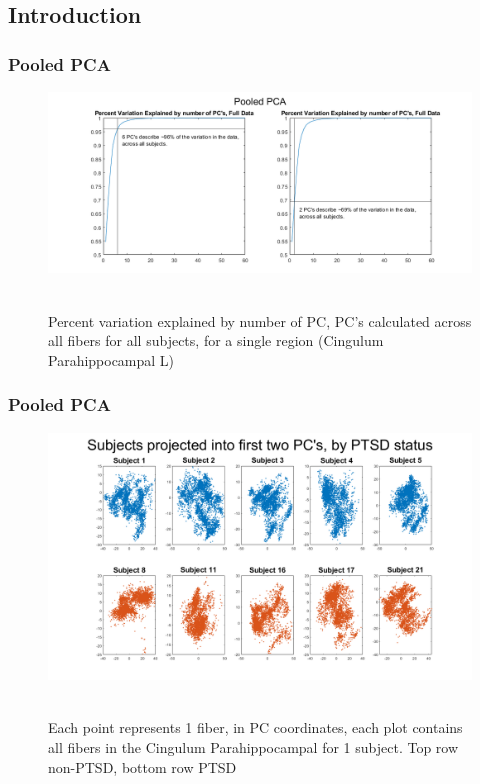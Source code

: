 \documentclass{beamer}
\begin{document}
\subsection{Introduction}
\begin{frame}
\frametitle{Pooled PCA}

    \begin{figure}[h!]
  \centering

    \includegraphics[width=\textwidth]{pooledPCA.png}\\~\\
    \caption{Percent variation explained by number of PC, PC's calculated across all fibers for all subjects, for a single region (Cingulum Parahippocampal L)}


  \label{fig:coffee1}
\end{figure}
\end{frame}


\begin{frame}
\frametitle{Pooled PCA}

    \begin{figure}[h!]
  \centering

    \includegraphics[width=.8\textwidth]{scatterDim2.png}\\~\\
    \caption{Each point represents 1 fiber, in PC coordinates, each plot contains all fibers in the Cingulum Parahippocampal for 1 subject. Top row non-PTSD, bottom row PTSD}


  \label{fig:coffee1}
\end{figure}
\end{frame}
\end{document}

